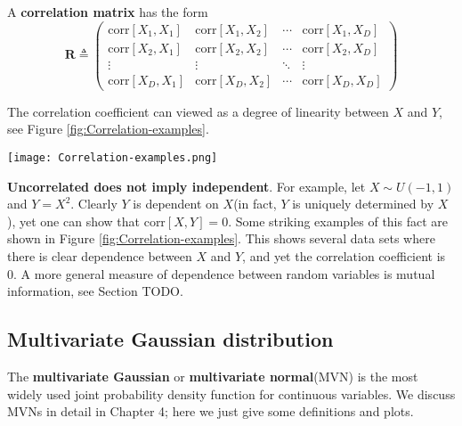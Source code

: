 A \textbf{correlation matrix} has the form
\begin{equation}
\mathbf{R} \triangleq \left( \begin{array}{cccc}
           \text{corr}[X_1,X_1] & \text{corr}[X_1,X_2] & \cdots & \text{corr}[X_1,X_D] \\
           \text{corr}[X_2,X_1] & \text{corr}[X_2,X_2] & \cdots & \text{corr}[X_2,X_D] \\
		   \vdots & \vdots & \ddots & \vdots \\
           \text{corr}[X_D,X_1] & \text{corr}[X_D,X_2] & \cdots & \text{corr}[X_D,X_D] \end{array} \right)
\end{equation}

The correlation coefficient can viewed as a degree of linearity between $X$ and $Y$, see Figure \ref{fig:Correlation-examples}.
\begin{figure*}[hbtp]
\centering
    \texttt{[image: Correlation-examples.png]}
\caption{Several sets of $(x, y)$ points, with the Pearson correlation coefficient of $x$ and $y$ for each set. Note that the correlation reflects the noisiness and direction of a linear relationship (top row), but not the slope of that relationship (middle), nor many aspects of nonlinear relationships (bottom). N.B.: the figure in the center has a slope of 0 but in that case the correlation coefficient is undefined because the variance of $Y$ is zero.Source:\url{http://en.wikipedia.org/wiki/Correlation}}
\label{fig:Correlation-examples} 
\end{figure*}

\textbf{Uncorrelated does not imply independent}. For example, let $X \sim U(-1,1)$ and $Y =X^2$. Clearly $Y$ is dependent on $X$(in fact, $Y$ is uniquely determined by $X$), yet one can show that corr$[X, Y]=0$. Some striking examples of this fact are shown in Figure \ref{fig:Correlation-examples}. This shows several data sets where there is clear dependence between $X$ and $Y$, and yet the correlation coefficient is 0. A more general measure of dependence between random variables is mutual information, see Section TODO.


\subsection{Multivariate Gaussian distribution}
\label{sec:MVN}
The \textbf{multivariate Gaussian} or \textbf{multivariate normal}(MVN) is the most widely used joint probability density function for continuous variables. We discuss MVNs in detail in Chapter 4; here we just give some definitions and plots.

